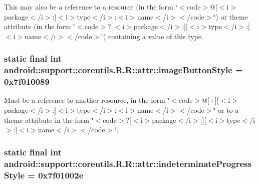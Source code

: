 This may also be a reference to a resource (in the form \char`\"{}$<$code$>$@\mbox{[}$<$i$>$package$<$/i$>$:\mbox{]}$<$i$>$type$<$/i$>$:$<$i$>$name$<$/i$>$$<$/code$>$\char`\"{}) or theme attribute (in the form \char`\"{}$<$code$>$?\mbox{[}$<$i$>$package$<$/i$>$:\mbox{]}\mbox{[}$<$i$>$type$<$/i$>$:\mbox{]}$<$i$>$name$<$/i$>$$<$/code$>$\char`\"{}) containing a value of this type. \hypertarget{classandroid_1_1support_1_1coreutils_1_1_r_1_1attr_b1370794750a6d010ffd4b8590164854}{
\subsubsection[{imageButtonStyle}]{\setlength{\rightskip}{0pt plus 5cm}static final int android::support::coreutils.R.R::attr::imageButtonStyle = 0x7f010089}}
\label{classandroid_1_1support_1_1coreutils_1_1_r_1_1attr_b1370794750a6d010ffd4b8590164854}


Must be a reference to another resource, in the form \char`\"{}$<$code$>$@\mbox{[}+\mbox{]}\mbox{[}$<$i$>$package$<$/i$>$:\mbox{]}$<$i$>$type$<$/i$>$:$<$i$>$name$<$/i$>$$<$/code$>$\char`\"{} or to a theme attribute in the form \char`\"{}$<$code$>$?\mbox{[}$<$i$>$package$<$/i$>$:\mbox{]}\mbox{[}$<$i$>$type$<$/i$>$:\mbox{]}$<$i$>$name$<$/i$>$$<$/code$>$\char`\"{}. \hypertarget{classandroid_1_1support_1_1coreutils_1_1_r_1_1attr_67651f9872f56e46a6c135991234a189}{
\subsubsection[{indeterminateProgressStyle}]{\setlength{\rightskip}{0pt plus 5cm}static final int android::support::coreutils.R.R::attr::indeterminateProgressStyle = 0x7f01002e}}
\label{classandroid_1_1support_1_1coreutils_1_1_r_1_1attr_67651f9872f56e46a6c135991234a189}


